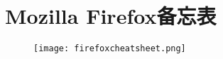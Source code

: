 \chapter{Mozilla Firefox备忘表}

\vspace{-45pt}

\begin{figure}[!ht]
\centering
\texttt{[image: firefoxcheatsheet.png]}
\end{figure}

\clearpage

